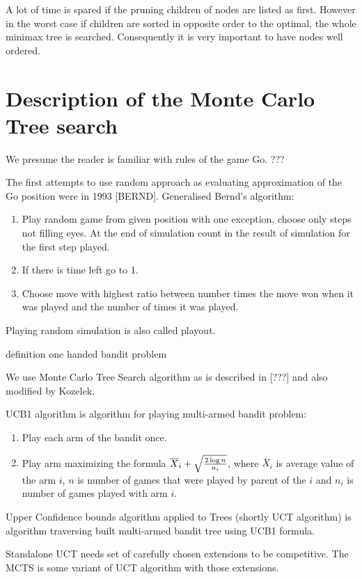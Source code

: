 A lot of time is spared if the pruning children of nodes are listed as first.
However in the worst case if children are sorted in opposite order to the
optimal, the whole minimax tree is searched. Consequently it is very important
to have nodes well ordered.


\section{Description of the Monte Carlo Tree search}
We presume the reader is familiar with rules of the game Go. {???}

The first attempts to use random approach as evaluating approximation of the Go
position were in 1993 [BERND]. Generalised Bernd's algorithm:

\begin{enumerate}
\item Play random game from given position with one exception, choose only
	  steps not filling eyes. At the end of simulation count in the result of
	  simulation for the first step played.
\item If there is time left go to 1.
\item Choose move with highest ratio between number times the move won when it
	  was played and the number of times it was played.
\end{enumerate}

Playing random simulation is also called playout.

definition one handed bandit problem

We use Monte Carlo Tree Search algorithm as is described in [???] and also
modified by Kozelek.


UCB1 algorithm is algorithm for playing multi-armed bandit problem:

\begin{enumerate}
\item Play each arm of the bandit once.
\item Play arm maximizing the formula $\overline X_i + \sqrt{2 \log n \over n_i}$,
	  where $\overline X_i$ is average value of the arm $i$, $n$ is number
	  of games that were played by parent of the $i$ and $n_i$ is number of
	  games played with arm $i$.
\end{enumerate}

Upper Confidence bounds algorithm applied to Trees (shortly UCT algorithm) is
algorithm traversing built multi-armed bandit tree using UCB1 formula.

	
Standalone UCT needs set of carefully chosen extensions to be competitive. The
MCTS is some variant of UCT algorithm with those extensions.
